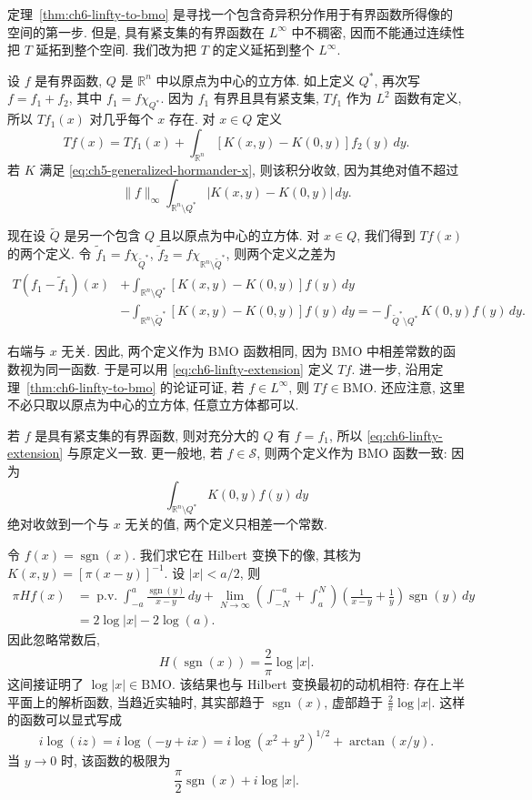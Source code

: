 定理~\ref{thm:ch6-linfty-to-bmo} 是寻找一个包含奇异积分作用于有界函数所得像的空间的第一步. 但是, 具有紧支集的有界函数在 $L^\infty$ 中不稠密, 因而不能通过连续性把 $T$ 延拓到整个空间. 我们改为把 $T$ 的定义延拓到整个 $L^\infty$.

设 $f$ 是有界函数, $Q$ 是 $\mathbb R^n$ 中以原点为中心的立方体. 如上定义 $Q^*$, 再次写 $f=f_1+f_2$, 其中 $f_1=f\chi_{Q^*}$. 因为 $f_1$ 有界且具有紧支集, $Tf_1$ 作为 $L^2$ 函数有定义, 所以 $Tf_1(x)$ 对几乎每个 $x$ 存在. 对 $x\in Q$ 定义
\begin{equation}
\label{eq:ch6-linfty-extension}
 Tf(x)=Tf_1(x)+\int_{\mathbb R^n}[K(x,y)-K(0,y)]f_2(y)\,dy.
\end{equation}
若 $K$ 满足 \eqref{eq:ch5-generalized-hormander-x}, 则该积分收敛, 因为其绝对值不超过
\[
 \|f\|_\infty\int_{\mathbb R^n\setminus Q^*}|K(x,y)-K(0,y)|\,dy.
\]

现在设 $\widetilde Q$ 是另一个包含 $Q$ 且以原点为中心的立方体. 对 $x\in Q$, 我们得到 $Tf(x)$ 的两个定义. 令 $\widetilde f_1=f\chi_{\widetilde Q^*}$, $\widetilde f_2=f\chi_{\mathbb R^n\setminus\widetilde Q^*}$, 则两个定义之差为
\[
\begin{aligned}
 T(f_1-\widetilde f_1)(x)
 &+\int_{\mathbb R^n\setminus Q^*}[K(x,y)-K(0,y)]f(y)\,dy\\
 &-\int_{\mathbb R^n\setminus\widetilde Q^*}[K(x,y)-K(0,y)]f(y)\,dy
 =-\int_{\widetilde Q^*\setminus Q^*}K(0,y)f(y)\,dy.
\end{aligned}
\]

\hypertarget{chapter-06-page-132}{}
右端与 $x$ 无关. 因此, 两个定义作为 BMO 函数相同, 因为 BMO 中相差常数的函数视为同一函数. 于是可以用 \eqref{eq:ch6-linfty-extension} 定义 $Tf$. 进一步, 沿用定理~\ref{thm:ch6-linfty-to-bmo} 的论证可证, 若 $f\in L^\infty$, 则 $Tf\in\mathrm{BMO}$. 还应注意, 这里不必只取以原点为中心的立方体, 任意立方体都可以.

若 $f$ 是具有紧支集的有界函数, 则对充分大的 $Q$ 有 $f=f_1$, 所以 \eqref{eq:ch6-linfty-extension} 与原定义一致. 更一般地, 若 $f\in\mathcal S$, 则两个定义作为 BMO 函数一致: 因为
\[
 \int_{\mathbb R^n\setminus Q^*}K(0,y)f(y)\,dy
\]
绝对收敛到一个与 $x$ 无关的值, 两个定义只相差一个常数.

\begin{Example}
\label{ex:ch6-hilbert-transform-sign}
令 $f(x)=\operatorname{sgn}(x)$. 我们求它在 Hilbert 变换下的像, 其核为 $K(x,y)=[\pi(x-y)]^{-1}$. 设 $|x|<a/2$, 则
\[
\begin{aligned}
 \pi Hf(x)
 &=\operatorname{p.v.}\int_{-a}^a\frac{\operatorname{sgn}(y)}{x-y}\,dy
 +\lim_{N\to\infty}\left(\int_{-N}^{-a}+\int_a^N\right)
 \left(\frac1{x-y}+\frac1y\right)\operatorname{sgn}(y)\,dy\\
 &=2\log|x|-2\log(a).
\end{aligned}
\]
因此忽略常数后,
\[
 H(\operatorname{sgn}(x))=\frac2\pi\log|x|.
\]
这间接证明了 $\log|x|\in\mathrm{BMO}$. 该结果也与 Hilbert 变换最初的动机相符: 存在上半平面上的解析函数, 当趋近实轴时, 其实部趋于 $\operatorname{sgn}(x)$, 虚部趋于 $\frac2\pi\log|x|$. 这样的函数可以显式写成
\[
 i\log(iz)=i\log(-y+ix)=i\log(x^2+y^2)^{1/2}+\arctan(x/y).
\]
当 $y\to0$ 时, 该函数的极限为
\[
 \frac\pi2\operatorname{sgn}(x)+i\log|x|.
\]
\end{Example}
